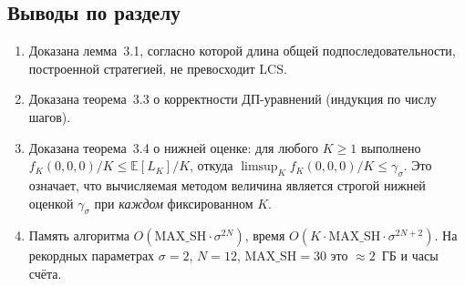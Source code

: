 \subsection*{Выводы по разделу}

\begin{enumerate}
    \item Доказана лемма~3.1, согласно которой длина общей подпоследовательности, построенной стратегией, не превосходит LCS.
    \item Доказана теорема~3.3 о корректности ДП-уравнений (индукция по числу шагов).
    \item Доказана теорема~3.4 о нижней оценке: для любого $K \geq 1$ выполнено $f_K(0,0,0)/K \leq \mathbb{E}[L_K]/K$, откуда $\limsup_K f_K(0,0,0)/K \leq \gamma_\sigma$. Это означает, что вычисляемая методом величина является строгой нижней оценкой $\gamma_\sigma$ при \emph{каждом} фиксированном $K$.
    \item Память алгоритма $O(\mathrm{MAX\_SH} \cdot \sigma^{2N})$, время $O(K \cdot \mathrm{MAX\_SH} \cdot \sigma^{2N+2})$. На рекордных параметрах $\sigma = 2$, $N = 12$, $\mathrm{MAX\_SH} = 30$ это $\approx 2$~ГБ и часы счёта.
\end{enumerate}
